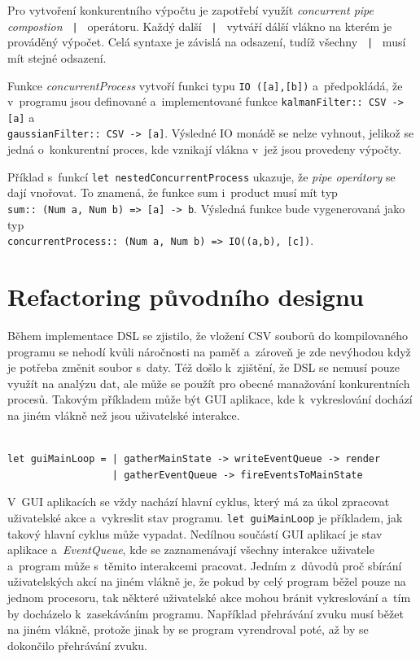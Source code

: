 \documentclass[male, czech]{kithesis}
\newenvironment{code}{\captionsetup{type=listing}}{}
\newcommand{\haskellInline}[1]{\colorbox{gray!10}{\texttt{#1}}}
\begin{document}
Pro vytvoření konkurentního výpočtu je zapotřebí využít \textit{concurrent pipe compostion}
\haskellInline{ | } operátoru. 
Každý další \haskellInline{ | } vytváří dálší vlákno na kterém je prováděný výpočet.
Celá syntaxe je závislá na odsazení, 
tudíž všechny \haskellInline{ | } musí mít stejné odsazení.

Funkce \textit{concurrentProcess} vytvoří funkci typu \haskellInline{IO ([a],[b])}
a~předpokládá, 
že v~programu jsou definované a~implementované funkce
\haskellInline{kalmanFilter:: CSV -> [a]} a~\\
\haskellInline{gaussianFilter:: CSV -> [a]}. 
Výsledné IO monádě se nelze vyhnout, 
jelikož se jedná o~konkurentní proces, 
kde vznikají vlákna v~jež jsou provedeny výpočty. 

Příklad s~funkcí \haskellInline{let nestedConcurrentProcess} ukazuje, 
že \textit{pipe operátory} se dají vnořovat. 
To znamená, 
že funkce sum i~product musí mít typ \\
\haskellInline{sum:: (Num a, Num b) => [a] -> b}. 
Výsledná funkce bude vygenerovaná jako typ \\
\haskellInline{concurrentProcess:: (Num a, Num b) => IO((a,b), [c])}.

\section{Refactoring původního designu}

Během implementace DSL se zjistilo,
že vložení CSV souborů do kompilovaného programu se nehodí
kvůli náročnosti na paměť
a~zároveň je zde nevýhodou když je potřeba změnit soubor s~daty.
Též došlo k~zjištění,
že DSL se nemusí pouze využít na analýzu dat,
ale může se použít pro obecné manažování konkurentních procesů.
Takovým příkladem může být GUI aplikace,
kde k~vykreslování dochází na jiném vlákně 
než jsou uživatelské interakce.

\begin{code}
\begin{verbatim}

let guiMainLoop = | gatherMainState -> writeEventQueue -> render
                  | gatherEventQueue -> fireEventsToMainState

\end{verbatim}
\end{code}

V~GUI aplikacích se vždy nachází hlavní cyklus,
který má za úkol zpracovat uživatelské akce
a~vykreslit stav programu.
\haskellInline{let guiMainLoop} je příkladem,
jak takový hlavní cyklus může vypadat.
Nedílnou součástí GUI aplikací je stav aplikace
a~\textit{EventQueue}, kde
se zaznamenávají všechny interakce uživatele
a~program může s~těmito interakcemi pracovat.
Jedním z~důvodů proč sbírání uživatelských akcí na jiném vlákně je,
že pokud by celý program běžel pouze na jednom procesoru,
tak některé uživatelské akce mohou bránit vykreslování
a~tím by docházelo k~zasekáváním programu.
Například přehrávání zvuku musí běžet na jiném vlákně,
protože jinak by se program vyrendroval poté,
až by se dokončilo přehrávání zvuku.
\end{document}
